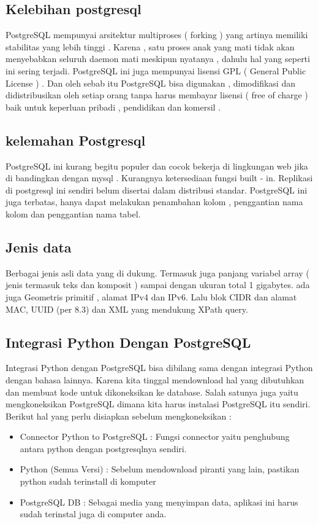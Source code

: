 \subsection { Kelebihan postgresql }
PostgreSQL mempunyai arsitektur multiproses ( forking ) yang artinya memiliki stabilitas yang lebih tinggi . Karena , satu proses anak yang mati tidak akan menyebabkan seluruh daemon mati meskipun nyatanya , dahulu hal yang seperti ini sering terjadi. PostgreSQL ini juga mempunyai lisensi GPL ( General Public License ) . Dan oleh sebab itu PostgreSQL bisa digunakan , dimodifikasi dan didistribusikan oleh setiap orang tanpa harus membayar lisensi ( free of charge ) baik untuk keperluan pribadi , pendidikan dan komersil .

\subsection {kelemahan Postgresql}
PostgreSQL ini kurang begitu populer dan cocok bekerja di lingkungan web jika di bandingkan dengan mysql . Kurangnya ketersediaan fungsi built - in. Replikasi di postgresql ini sendiri belum disertai dalam distribusi standar. PostgreSQL ini juga terbatas, hanya dapat melakukan penambahan kolom , penggantian nama kolom dan penggantian nama tabel.

\subsection { Jenis data }
Berbagai jenis asli data yang di dukung. Termasuk juga panjang variabel array ( jenis termasuk teks dan komposit ) sampai dengan ukuran total 1 gigabytes. ada juga Geometris primitif , alamat IPv4 dan IPv6. Lalu blok CIDR dan alamat MAC, UUID (per 8.3) dan XML yang mendukung XPath query.

\subsection{Integrasi Python Dengan PostgreSQL} 
Integrasi Python dengan PostgreSQL bisa dibilang sama dengan integrasi Python dengan bahasa lainnya.  Karena kita tinggal mendownload hal yang dibutuhkan dan membuat kode untuk dikoneksikan ke database. Salah satunya juga yaitu mengkoneksikan PostgreSQL dimana kita harus instalasi PostgreSQL itu sendiri. Berikut hal yang perlu disiapkan sebelum mengkoneksikan : 
\begin{itemize}
\item Connector Python to PostgreSQL : Fungsi connector yaitu penghubung antara python dengan postgresqlnya sendiri. 
\item Python (Semua Versi) : Sebelum mendownload piranti yang lain, pastikan python sudah terinstall di komputer
\item PostgreSQL DB : Sebagai media yang menyimpan data, aplikasi ini harus sudah terinstal juga di computer anda.
\end{itemize}

